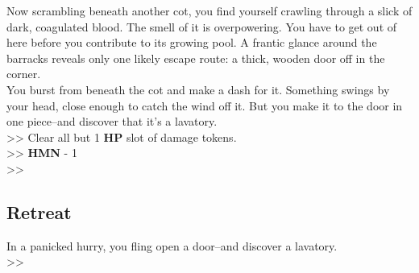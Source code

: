Now scrambling beneath another cot, you find yourself crawling through a slick of dark, coagulated blood. The smell of it is overpowering. You have to get out of here before you contribute to its growing pool. A frantic glance around the barracks reveals only one likely escape route: a thick, wooden door off in the corner.\\

You burst from beneath the cot and make a dash for it. Something swings by your head, close enough to catch the wind off it. But you make it to the door in one piece--and discover that it’s a lavatory.\\

>> Clear all but 1 \textbf{HP} slot of damage tokens.\\
>> \textbf{HMN} - 1\\
>> 

\subsection*{Retreat}
In a panicked hurry, you fling open a door--and discover a lavatory.\\

>> 